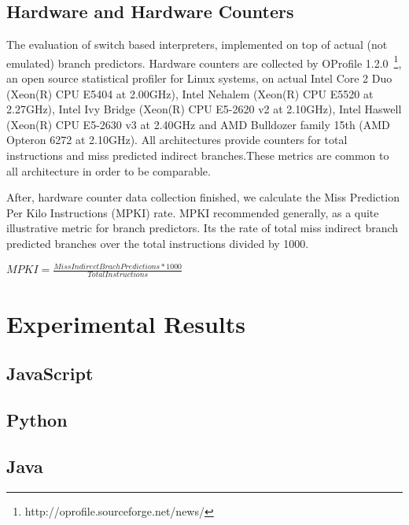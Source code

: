 \documentclass[parskip=full, paper=a4, fontsize=12pt]{scrartcl}
\numberwithin{equation}{section}
\numberwithin{figure}{section}
\numberwithin{table}{section}
\begin{document}
\subsection{Hardware and Hardware Counters}
The evaluation of switch based interpreters, implemented on top of
actual (not emulated) branch predictors. Hardware counters are
collected by OProfile
1.2.0~\footnote{http://oprofile.sourceforge.net/news/}, an open source
statistical profiler for Linux systems, on actual Intel Core 2 Duo
(Xeon(R) CPU E5404 at 2.00GHz), Intel Nehalem (Xeon(R) CPU E5520 at
2.27GHz), Intel Ivy Bridge (Xeon(R) CPU E5-2620 v2 at 2.10GHz), Intel
Haswell (Xeon(R) CPU E5-2630 v3 at 2.40GHz and AMD Bulldozer family
15th (AMD Opteron 6272 at 2.10GHz). All architectures provide counters
for total instructions and miss predicted indirect branches.These
metrics are common to all architecture in order to be comparable.


After, hardware counter data collection finished, we calculate the
Miss Prediction Per Kilo Instructions (MPKI) rate. MPKI recommended
generally, as a quite illustrative metric for branch predictors. Its
the rate of total miss indirect branch predicted branches over the
total instructions divided by 1000.
\begin{center}
   $ MPKI = \frac{Miss Indirect Brach Predictions * 1000}{Total Instructions} $
\end{center}

\section{Experimental Results}
\subsection{JavaScript}

\subsection{Python}

\subsection{Java}
\end{document}
